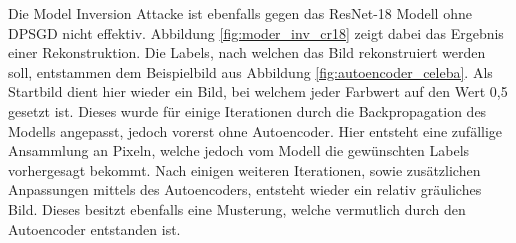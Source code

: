 Die Model Inversion Attacke ist ebenfalls gegen das ResNet-18 Modell ohne DPSGD nicht effektiv.
Abbildung \ref{fig:moder_inv_cr18} zeigt dabei das Ergebnis einer Rekonstruktion. 
Die Labels, nach welchen das Bild rekonstruiert werden soll, entstammen dem Beispielbild aus Abbildung \ref{fig:autoencoder_celeba}.
Als Startbild dient hier wieder ein Bild, bei welchem jeder Farbwert auf den Wert 0,5 gesetzt ist.
Dieses wurde für einige Iterationen durch die Backpropagation des Modells angepasst, jedoch vorerst ohne Autoencoder.
Hier entsteht eine zufällige Ansammlung an Pixeln, welche jedoch vom Modell die gewünschten Labels vorhergesagt bekommt.
Nach einigen weiteren Iterationen, sowie zusätzlichen Anpassungen mittels des Autoencoders, entsteht wieder ein relativ gräuliches Bild.
Dieses besitzt ebenfalls eine Musterung, welche vermutlich durch den Autoencoder entstanden ist.
